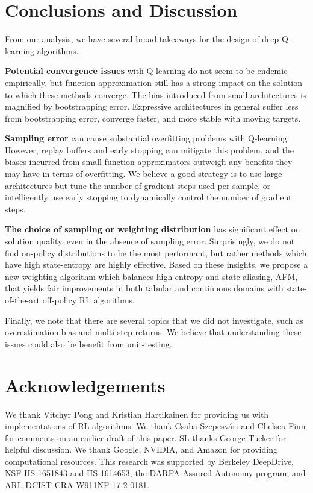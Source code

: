 \section{Conclusions and Discussion}

From our analysis, we have several broad takeaways for the design of deep Q-learning algorithms. 

\textbf{Potential convergence issues} with Q-learning do not seem to be endemic empirically, but function approximation still has a strong impact on the solution to which these methods converge. The bias introduced from small architectures is magnified by bootstrapping error.
Expressive architectures in general suffer less from bootstrapping error, converge faster, and more stable with moving targets.

\textbf{Sampling error} can cause substantial overfitting problems with Q-learning. However, replay buffers and early stopping can mitigate this problem, and the biases incurred from small function approximators outweigh any benefits they may have in terms of overfitting. We believe a good strategy is to use large architectures but tune the number of gradient steps used per sample, or intelligently use early stopping to dynamically control the number of gradient steps. 

\textbf{The choice of sampling or weighting distribution} has significant effect on solution quality, even in the absence of sampling error. Surprisingly, we do not find on-policy distributions to be the most performant, but rather methods which have high state-entropy are highly effective. Based on these insights, we propose a new weighting algorithm which balances high-entropy and state aliasing, AFM, that yields fair improvements in both tabular and continuous domains with state-of-the-art off-policy RL algorithms.


Finally, we note that there are several topics that we did not investigate, such as overestimation bias and multi-step returns. We believe that understanding these issues could also be benefit from unit-testing.


\section*{Acknowledgements}
We thank Vitchyr Pong and Kristian Hartikainen for providing us with implementations of RL algorithms. We thank Csaba Szepesv\'{a}ri and Chelsea Finn for comments on an earlier draft of this paper. SL thanks George Tucker for helpful discussion. We thank Google, NVIDIA, and Amazon
for providing computational resources. This research was supported by Berkeley DeepDrive, NSF IIS-1651843 and IIS-1614653, the DARPA Assured Autonomy program, and ARL DCIST CRA W911NF-17-2-0181.
